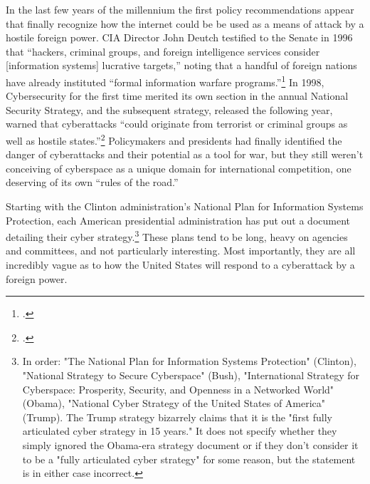 \documentclass{memoir}
\begin{document}
\begin{refsegment}
In the last few years of the millennium the first policy recommendations appear that finally recognize how the internet could be be used as a means of attack by a hostile foreign power. CIA Director John Deutch testified to the Senate in 1996 that ``hackers, criminal groups, and foreign intelligence services consider [information systems] lucrative targets,'' noting that a handful of foreign nations have already instituted ``formal information warfare programs.''\footcite{deutch_worldwide_1996} In 1998, Cybersecurity for the first time merited its own section in the annual National Security Strategy, and the subsequent strategy, released the following year, warned that cyberattacks ``could originate from terrorist or criminal groups as well as hostile states.''\footcite[~p.760-761]{boys_clinton_2018} Policymakers and presidents had finally identified the danger of cyberattacks and their potential as a tool for war, but they still weren't conceiving of cyberspace as a unique domain for international competition, one deserving of its own ``rules of the road.''

Starting with the Clinton administration's National Plan for Information Systems Protection, each American presidential administration has put out a document detailing their cyber strategy.\footnote{In order: "The National Plan for Information Systems Protection" (Clinton), "National Strategy to Secure Cyberspace" (Bush), "International Strategy for Cyberspace: Prosperity, Security, and Openness in a Networked World" (Obama), "National Cyber Strategy of the United States of America" (Trump). The Trump strategy bizarrely claims that it is the "first fully articulated cyber strategy in 15 years." It does not specify whether they simply ignored the Obama-era strategy document or if they don't consider it to be a "fully articulated cyber strategy" for some reason, but the statement is in either case incorrect.} These plans tend to be long, heavy on agencies and committees, and not particularly interesting. Most importantly, they are all incredibly vague as to how the United States will respond to a cyberattack by a foreign power.


\end{refsegment}
\end{document}
